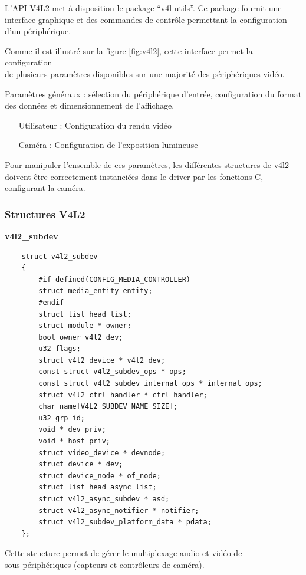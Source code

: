L’API V4L2 met à disposition le package “v4l-utils”. Ce package fournit une interface
graphique et des commandes de contrôle permettant la configuration d’un périphérique. \medskip

Comme il est illustré sur la figure \ref{fig:v4l2}, cette interface permet la configuration \\
de  plusieurs paramètres disponibles sur une majorité des périphériques vidéo. \medskip

Paramètres généraux : sélection du périphérique d'entrée, configuration du format des données et
dimensionnement de l'affichage.

\begin{itemize}
    \item[Utilisateur : ] Configuration du rendu vidéo
    \item[Caméra : ] Configuration de l'exposition lumineuse
\end{itemize}

Pour manipuler l'ensemble de ces paramètres, les différentes structures de v4l2 doivent
être correctement instanciées dans le driver par les fonctions C, configurant la caméra.

\subsubsection{Structures V4L2}

\textbf{v4l2\_subdev}

\begin{lstlisting}
    struct v4l2_subdev
    {
        #if defined(CONFIG_MEDIA_CONTROLLER)
        struct media_entity entity;
        #endif
        struct list_head list;
        struct module * owner;
        bool owner_v4l2_dev;
        u32 flags;
        struct v4l2_device * v4l2_dev;
        const struct v4l2_subdev_ops * ops;
        const struct v4l2_subdev_internal_ops * internal_ops;
        struct v4l2_ctrl_handler * ctrl_handler;
        char name[V4L2_SUBDEV_NAME_SIZE];
        u32 grp_id;
        void * dev_priv;
        void * host_priv;
        struct video_device * devnode;
        struct device * dev;
        struct device_node * of_node;
        struct list_head async_list;
        struct v4l2_async_subdev * asd;
        struct v4l2_async_notifier * notifier;
        struct v4l2_subdev_platform_data * pdata;
    };
\end{lstlisting}

Cette structure permet de gérer le multiplexage audio et vidéo de \\
sous-périphériques (capteurs et contrôleurs de caméra).

